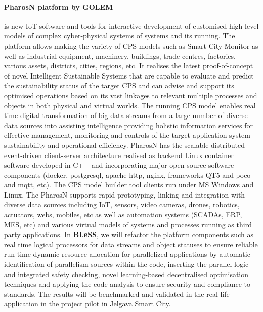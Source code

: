 \documentclass[a4paper,11pt]{article}
\newcommand{\project}[1]{\textbf{#1}\xspace}
\newcommand{\BLESS}{\project{BLeSS}}
\newcommand{\TheProject}{\BLESS}
\begin{document}
\paragraph{PharosN platform by GOLEM}is new IoT software and tools for interactive development of customised high level models of complex cyber-physical systems of systems and  its running.  The platform allows making the variety of CPS models such as {Smart City Monitor} as well as industrial equipment, machinery, buildings, trade centres, factories, various assets, districts, cities, regions, etc.  It realises the latest proof-of-concept of novel Intelligent Sustainable Systems that are capable to evaluate and predict the sustainability status of the target CPS and can advise and support its optimised operations based on its vast linkages to relevant multiple processes and objects in both physical and virtual worlds. The running CPS model enables real time digital transformation of big data streams from a large number of diverse data sources into assisting intelligence providing holistic information services  for effective management, monitoring and controls of the target application system sustainability and operational efficiency. PharosN has the scalable distributed event-driven client-server architecture realised as backend Linux container software developed in C++ and incorporating  major open source software components (docker, postgresql, apache http, nginx, frameworks QT5 and poco and mqtt, etc). The CPS model builder tool clients run under MS Windows and Linux. The PharosN supports rapid prototyping, linking and integration with diverse data sources including IoT, sensors, video cameras, drones, robotics, actuators, webs, mobiles, etc as well as automation  systems  (SCADAs, ERP, MES, etc) and various virtual models of systems and processes running as third party applications.
In \TheProject, we will refactor the platform components such as real time logical processors for data streams and object statuses to ensure reliable run-time dynamic resource allocation for parallelized applications by automatic identification of parallelism sources within the code, inserting the parallel logic and integrated safety checking, novel learning-based decentralised optimisation techniques and applying the code analysis to ensure security and compliance to standards. The results will be benchmarked and validated in the real life application in the project pilot in Jelgava Smart City.  
\end{document}
